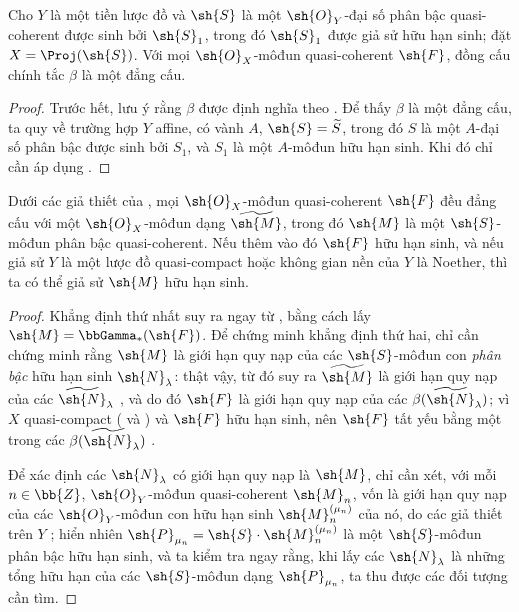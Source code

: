 \documentclass[oneside,10pt]{amsart}
\newcommand{\oldpage}[2][]{\marginnote{\normalfont\footnotesize\textbf{#1}~|~#2}\ignorespaces}
\let\EGAOriginalLabel\label
\renewcommand{\label}[1]{\phantomsection\EGAOriginalLabel{#1}}
\begin{document}
\begin{theorem}[3.4.4]
\label{II.3.4.4}
Cho $Y$ là một tiền lược đồ và $\sh{S}$ là một $\sh{O}_Y$-đại số phân bậc quasi-coherent được sinh bởi $\sh{S}_1$, trong đó $\sh{S}_1$ được giả sử hữu hạn sinh;
đặt $X=\Proj(\sh{S})$.
Với mọi $\sh{O}_X$-môđun quasi-coherent $\sh{F}$, đồng cấu chính tắc $\beta$  là một đẳng cấu.
\end{theorem}

\begin{proof}
Trước hết, lưu ý rằng $\beta$ được định nghĩa theo .
Để thấy $\beta$ là một đẳng cấu, ta quy về trường hợp $Y$ affine, có vành $A$, $\sh{S}=\widetilde{S}$, trong đó $S$ là một $A$-đại số phân bậc được sinh bởi $S_1$, và $S_1$ là một $A$-môđun hữu hạn sinh.
Khi đó chỉ cần áp dụng .
\end{proof}

\begin{corollary}[3.4.5]
\label{II.3.4.5}
Dưới các giả thiết của , mọi $\sh{O}_X$-môđun quasi-coherent $\sh{F}$ đều đẳng cấu với một $\sh{O}_X$-môđun dạng $\widetilde{\sh{M}}$, trong đó $\sh{M}$ là một $\sh{S}$-môđun phân bậc quasi-coherent.
Nếu thêm vào đó $\sh{F}$ hữu hạn sinh, và nếu giả sử $Y$ là một lược đồ quasi-compact hoặc không gian nền của $Y$ là Noether, thì ta có thể giả sử $\sh{M}$ hữu hạn sinh.
\end{corollary}
\oldpage[II]{60}
\begin{proof}
Khẳng định thứ nhất suy ra ngay từ , bằng cách lấy $\sh{M}=\bbGamma_*(\sh{F})$.
Để chứng minh khẳng định thứ hai, chỉ cần chứng minh rằng $\sh{M}$ là giới hạn quy nạp của các $\sh{S}$-môđun con \emph{phân bậc} hữu hạn sinh $\sh{N}_\lambda$: thật vậy, từ đó suy ra $\widetilde{\sh{M}}$ là giới hạn quy nạp của các $\widetilde{\sh{N}}_\lambda$ , và do đó $\sh{F}$ là giới hạn quy nạp của các $\beta(\widetilde{\sh{N}}_\lambda)$;
vì $X$ quasi-compact ( và ) và $\sh{F}$ hữu hạn sinh, nên $\sh{F}$ tất yếu bằng một trong các $\beta(\widetilde{\sh{N}}_\lambda)$ .

Để xác định các $\sh{N}_\lambda$ có giới hạn quy nạp là $\sh{M}$, chỉ cần xét, với mỗi $n\in\bb{Z}$, $\sh{O}_Y$-môđun quasi-coherent $\sh{M}_n$, vốn là giới hạn quy nạp của các $\sh{O}_Y$-môđun con hữu hạn sinh $\sh{M}_n^{(\mu_n)}$ của nó, do các giả thiết trên $Y$ ;
hiển nhiên $\sh{P}_{\mu_n}=\sh{S}\cdot\sh{M}_n^{(\mu_n)}$ là một $\sh{S}$-môđun phân bậc hữu hạn sinh, và ta kiểm tra ngay rằng, khi lấy các $\sh{N}_\lambda$ là những tổng hữu hạn của các $\sh{S}$-môđun dạng $\sh{P}_{\mu_n}$, ta thu được các đối tượng cần tìm.
\end{proof}
\end{document}
